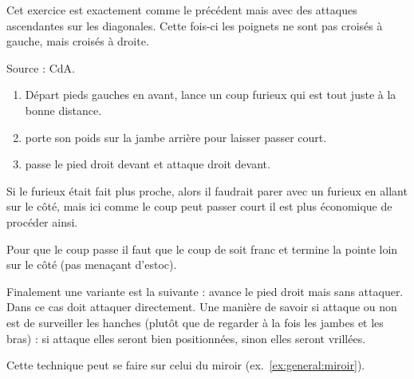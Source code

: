 \begin{exercice}
Cet exercice est exactement comme le précédent mais avec des attaques ascendantes sur les diagonales. Cette fois-ci les poignets ne sont pas croisés à gauche, mais croisés à droite.

Source : CdA.
\end{exercice}


% 
% 
% 


\begin{technique}

\begin{enumerate}
	\item Départ pieds gauches en avant, \A lance un coup furieux qui est tout juste à la bonne distance.
	\item \D porte son poids sur la jambe arrière pour laisser passer court.
	\item \D passe le pied droit devant et attaque droit devant.
\end{enumerate}

Si le furieux était fait plus proche, alors il faudrait parer avec un furieux en allant sur le côté, mais ici comme le coup peut passer court il est plus économique de procéder ainsi.

Pour que le coup passe il faut que le coup de \D soit franc et termine la pointe loin sur le côté (pas menaçant d'estoc).

Finalement une variante est la suivante : \A avance le pied droit mais sans attaquer. Dans ce cas \D doit attaquer directement. Une manière de savoir si \A attaque ou non est de surveiller les hanches (plutôt que de regarder à la fois les jambes et les bras) : si \A attaque elles seront bien positionnées, sinon elles seront vrillées.

Cette technique peut se faire sur celui du miroir (ex.~\ref{ex:general:miroir}).
\end{technique}



